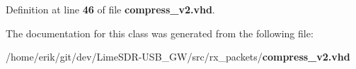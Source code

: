 Definition at line {\bf 46} of file {\bf compress\+\_\+v2.\+vhd}.



The documentation for this class was generated from the following file\+:\begin{DoxyCompactItemize}
\item 
/home/erik/git/dev/\+Lime\+S\+D\+R-\/\+U\+S\+B\+\_\+\+G\+W/src/rx\+\_\+packets/{\bf compress\+\_\+v2.\+vhd}\end{DoxyCompactItemize}
